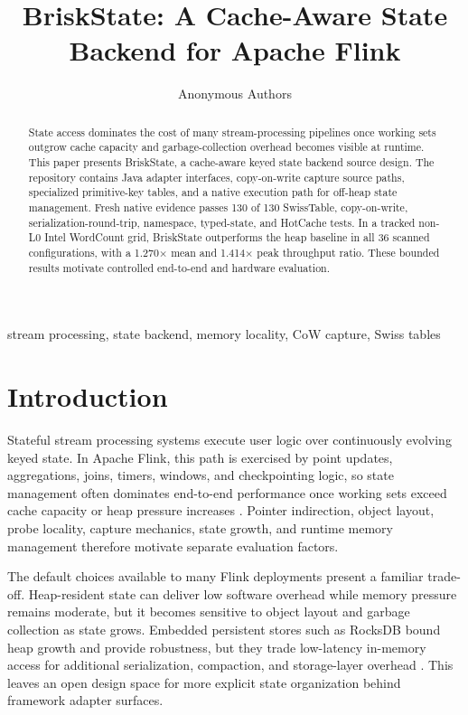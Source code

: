 \documentclass[journal]{IEEEtran}
\newcommand{\briskstate}{BriskState\xspace}
\newcommand{\system}{\briskstate}
\begin{document}
\title{\briskstate: A Cache-Aware State Backend for Apache Flink}

\author{Anonymous Authors}

\maketitle

\begin{abstract}
State access dominates the cost of many stream-processing pipelines once working sets outgrow cache capacity and garbage-collection overhead becomes visible at runtime. This paper presents \system, a cache-aware keyed state backend source design. The repository contains Java adapter interfaces, copy-on-write capture source paths, specialized primitive-key tables, and a native execution path for off-heap state management. Fresh native evidence passes 130 of 130 SwissTable, copy-on-write, serialization-round-trip, namespace, typed-state, and HotCache tests. In a tracked non-L0 Intel WordCount grid, \system outperforms the heap baseline in all 36 scanned configurations, with a 1.270$\times$ mean and 1.414$\times$ peak throughput ratio. These bounded results motivate controlled end-to-end and hardware evaluation.
\end{abstract}

\begin{IEEEkeywords}
stream processing, state backend, memory locality, CoW capture, Swiss tables
\end{IEEEkeywords}

\section{Introduction}

Stateful stream processing systems execute user logic over continuously evolving keyed state. In Apache Flink, this path is exercised by point updates, aggregations, joins, timers, windows, and checkpointing logic, so state management often dominates end-to-end performance once working sets exceed cache capacity or heap pressure increases \cite{carbone2015flink,carbone2017statemanagement}. Pointer indirection, object layout, probe locality, capture mechanics, state growth, and runtime memory management therefore motivate separate evaluation factors.

The default choices available to many Flink deployments present a familiar trade-off. Heap-resident state can deliver low software overhead while memory pressure remains moderate, but it becomes sensitive to object layout and garbage collection as state grows. Embedded persistent stores such as RocksDB bound heap growth and provide robustness, but they trade low-latency in-memory access for additional serialization, compaction, and storage-layer overhead \cite{rocksdb}. This leaves an open design space for more explicit state organization behind framework adapter surfaces.
\end{document}
